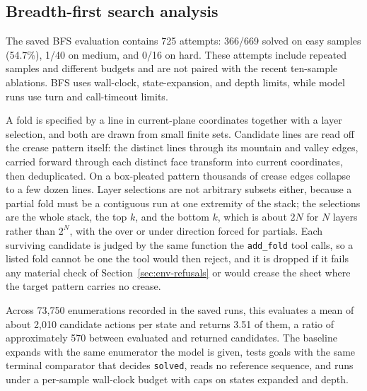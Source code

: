 \subsection{Breadth-first search analysis}
\label{app:bfs-analysis}
\label{sec:exp-baselines}
\label{sec:results-baseline}

The saved BFS evaluation contains 725 attempts: 366/669 solved on easy samples
(54.7\%), 1/40 on medium, and 0/16 on hard. These attempts include repeated samples
and different budgets and are not paired with the recent ten-sample ablations.
BFS uses wall-clock, state-expansion, and depth limits, while model runs use turn
and call-timeout limits.

A fold is specified by a line in current-plane coordinates together with a layer selection, and
both are drawn from small finite sets. Candidate lines are read off the crease pattern itself: the distinct lines through its mountain and valley edges,
carried forward through each distinct face transform into current coordinates, then deduplicated.
On a box-pleated pattern thousands of crease edges collapse to a few dozen lines. Layer selections
are not arbitrary subsets either, because a partial fold must be a contiguous run at one extremity
of the stack; the selections are the whole stack, the top $k$, and the bottom $k$, which is about
$2N$ for $N$ layers rather than $2^N$, with the over or under direction forced for partials. Each
surviving candidate is judged by the same function the \texttt{add\_fold} tool calls, so a listed
fold cannot be one the tool would then reject, and it is dropped if it fails any material check of
Section~\ref{sec:env-refusals} or would crease the sheet where the target pattern carries no
crease.

Across 73,750 enumerations recorded in the saved runs, this evaluates a mean of about 2,010
candidate actions per state and returns 3.51 of them, a ratio of approximately 570 between evaluated and returned candidates.
The baseline expands with the same enumerator the model is given, tests goals with the
same terminal comparator that decides \texttt{solved}, reads no reference sequence, and runs under
a per-sample wall-clock budget with caps on states expanded and depth.



